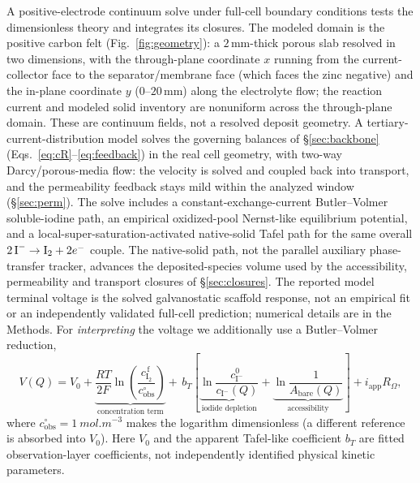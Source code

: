 \documentclass[11pt]{article}
\newcommand{\ci}{c_{\mathrm{I^-}}}
\newcommand{\cf}{c_{\mathrm{I_2}}^{\,\mathrm{f}}}
\newcommand{\iapp}{i_{\mathrm{app}}}
\begin{document}
A positive-electrode continuum solve under full-cell boundary conditions tests the dimensionless theory and
integrates its closures. The modeled domain is
the positive carbon felt (Fig.~\ref{fig:geometry}): a $2$\,mm-thick porous slab resolved in two dimensions,
with the through-plane coordinate $x$ running from the current-collector face to the separator/membrane face
(which faces the zinc negative) and the in-plane coordinate $y$ ($0$--$20$\,mm) along the electrolyte flow; the
reaction current and modeled solid inventory are nonuniform across the through-plane domain. These are
continuum fields, not a resolved deposit geometry. A tertiary-current-distribution model \citep{Newman1962,Tichter2020,Chakrabarti2020,AparicioMauricio2023} solves the
governing balances of \S\ref{sec:backbone} (Eqs.~\eqref{eq:cR}--\eqref{eq:feedback}) in the real cell
geometry, with two-way Darcy/porous-media flow: the velocity is solved and coupled back into
transport, and the permeability feedback stays mild within the analyzed window (\S\ref{sec:perm}).
The solve includes a constant-exchange-current Butler--Volmer soluble-iodine path, an empirical
oxidized-pool Nernst-like equilibrium potential, and a local-super-saturation-activated native-solid Tafel
path for the same overall $2\,\ce{I^-}\rightarrow\ce{I2}+2e^-$ couple. The native-solid path, not the
parallel auxiliary phase-transfer tracker, advances the deposited-species volume used by the accessibility,
permeability and transport closures of \S\ref{sec:closures}. The reported model
terminal voltage is the solved galvanostatic scaffold response, not an empirical fit or an independently
validated full-cell prediction; numerical details are in the Methods.
For \emph{interpreting} the voltage we additionally use a Butler--Volmer reduction,
\begin{equation}
V(Q)=V_0+\underbrace{\frac{RT}{2F}\ln\!\left(\frac{\cf}{c_{\mathrm{obs}}^{\circ}}\right)}_{\text{concentration term}}
      +\, b_T\!\left[\underbrace{\ln\!\frac{\ci^0}{\ci(Q)}}_{\text{iodide depletion}}
      +\underbrace{\ln\!\frac{1}{A_{\mathrm{bare}}(Q)}}_{\text{accessibility}}\right]+\iapp R_\Omega,
\label{eq:vred}
\end{equation}
where $c_{\mathrm{obs}}^{\circ}=\SI{1}{mol.m^{-3}}$ makes the logarithm dimensionless (a different reference is
absorbed into $V_0$). Here $V_0$ and the apparent Tafel-like coefficient $b_T$ are fitted observation-layer
coefficients, not independently identified physical kinetic parameters.
\end{document}

